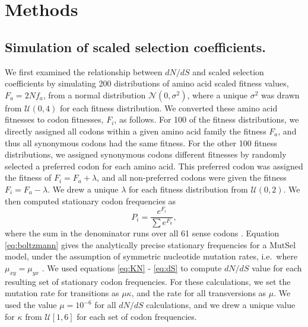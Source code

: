 \documentclass[11pt]{article}
\begin{document}
\section*{Methods}

\subsection*{Simulation of scaled selection coefficients.}

We first examined the relationship between $dN/dS$ and scaled selection coefficients by simulating 200 distributions of amino acid scaled fitness values, $F_a = 2Nf_a$, from a normal distribution $\mathcal{N}(0,\sigma^2)$, where a unique $\sigma^2$ was drawn from $\mathcal{U}(0,4)$ for each fitness distribution. We converted these amino acid fitnesses to codon fitnesses, $F_i$, as follows. For 100 of the fitness distributions, we directly assigned all codons within a given amino acid family the fitness $F_a$, and thus all synonymous codons had the same fitness. For the other 100 fitness distributions, we assigned synonymous codons different fitnesses by randomly selected a preferred codon for each amino acid. This preferred codon was assigned the fitness of $F_i = F_a + \lambda$, and all non-preferred codons were given the fitness $F_i = F_a - \lambda$. We drew a unique $\lambda$ for each fitness distribution from $\mathcal{U}(0,2)$. 
We then computed stationary codon frequencies as 
\begin{equation}\label{eq:boltzmann}
P_i = \frac{e^{F_i}}{\sum e^{F_k}}, 
\end{equation} where the sum in the denominator runs over all 61 sense codons \cite{SellaHirsh2005}. Equation \eqref{eq:boltzmann} gives the analytically precise stationary frequencies for a MutSel model, under the assumption of symmetric nucleotide mutation rates, i.e.\ where $\mu_{xy} = \mu_{yx}$ \cite{SellaHirsh2005}. We used equations \eqref{eq:KN} - \eqref{eq:dS} to compute $dN/dS$ value for each resulting set of stationary codon frequencies. For these calculations, we set the mutation rate for transitions as $\mu\kappa$, and the rate for all transversions as $\mu$. We used the value $\mu = 10^{-6}$ for all $dN/dS$ calculations, and we drew a unique value for $\kappa$ from $\mathcal{U}[1,6]$ for each set of codon frequencies.
\end{document}
